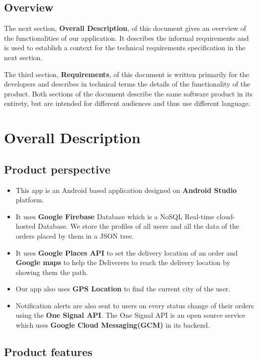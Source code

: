 \documentclass{report}
\begin{document}
\subsection{Overview}
The next section, \textbf{Overall Description}, of this document gives an overview of the functionalities of our application. It describes the informal requirements and is used to establish a context for the technical requirements specification in the next section. 

The third section, \textbf{Requirements}, of this document is written primarily for the developers and describes in technical terms the details of the functionality of the product. 
Both sections of the document describe the same software product in its entirety, but are intended for different audiences and thus use different language.


\section{Overall Description}
\subsection{Product perspective}

\begin{itemize}[label=$\circ$]
\item This app is an Android based application designed on \textbf{Android Studio} platform.
\item It uses \textbf{Google Firebase} Database which is a NoSQL Real-time cloud-hosted Database. We store the profiles of all users and all the data of the orders placed by them in a JSON tree. 
\item It uses \textbf{Google Places API} to set the delivery location of an order and \textbf{Google maps} to help the Deliverers to reach the delivery location by showing them the path. 
\item Our app also uses \textbf{GPS Location} to find the current city of the user. 
\item Notification alerts are also sent to users on every status change of their orders using the \textbf{One Signal API}. The One Signal API  is an open source service which uses \textbf{Google Cloud Messaging(GCM)} in its backend.
\end{itemize}

\subsection{Product features}
\end{document}
